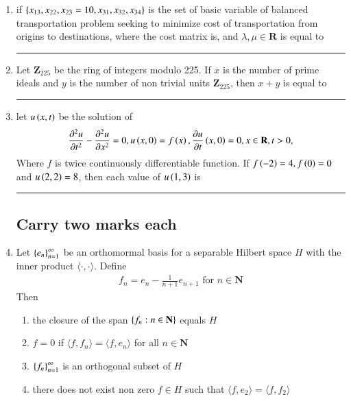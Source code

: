 \documentclass[journal]{IEEEtran}
\numberwithin{equation}{enumi}
\numberwithin{figure}{enumi}
\begin{document}
\begin{enumerate}
		\item 
		if $\left\{x_{13}, x_{22}, x_{23} = 10, x_{31}, x_{32}, x_{34}\right\}$ is the set of basic variable of  balanced transportation problem seeking to minimize cost of transportation from origins to destinations, where the cost matrix is, 
		and $\lambda, \mu \in \mathbf{R}$ is equal to \rule{2cm}{1pt}

		\item 
		Let $\mathbf{Z}_{225}$ be the ring of integers modulo 225. If $x$ is the number of prime ideals and $y$ is the number of non trivial units $\mathbf{Z}_{225}$, then $x + y$ is equal to \rule{2cm}{0.1pt}

		\item 
		let $u\left(x,t\right)$ be the solution of
		\begin{align*}
		\frac{\partial^2 u}{\partial t^2} - \frac{\partial^2 u}{\partial x^2} = 0, u\left(x,0\right) = f\left(x\right), \frac{\partial u}{\partial t}\left(x,0\right) = 0, x\in \mathbf{R}, t > 0,
		\end{align*}
		Where $f$ is twice continuously differentiable function. If $f\left(-2\right) = 4, f\left(0\right) = 0$ and $u\left(2,2\right) = 8$, then each value of $u\left(1,3\right)$ is \rule{2cm}{0.1pt}

\subsection{Carry two marks each}
		\item 
		Let $\left\{e_n\right\}_{n = 1}^{\infty}$ be an orthomormal basis for a separable Hilbert space $H$ with the inner product $\langle \cdot, \cdot \rangle$. Define 
		\begin{align*}
			f_n = e_n - \frac{1}{n + 1}e_{n + 1} \text{ for } n \in \mathbf{N}
		\end{align*}
		Then 
		\begin{enumerate}
			\item the closure of the span $\left\{f_n : n \in \mathbf{N}\right\}$ equals $H$
			\item $f = 0$ if $\langle{f}, f_n \rangle = \langle f, e_n \rangle$ for all $ n \in \mathbf{N}$
			\item $\left\{f_n\right\}_{n = 1}^{\infty}$ is an orthogonal subset of $H$
			\item there does not exist non zero $f \in H$ such that $\langle f , e_2\rangle = \langle{f}, f_2\rangle$
		\end{enumerate}


\end{enumerate}
\end{document}

